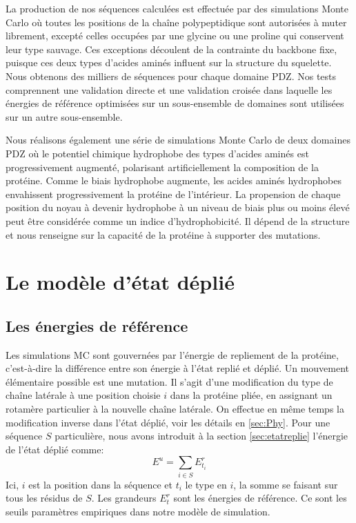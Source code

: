 La production de nos séquences calculées est effectuée par des simulations Monte Carlo où toutes les positions de la chaîne polypeptidique sont autorisées à muter librement, excepté celles occupées par une glycine ou une proline qui conservent leur type sauvage. Ces exceptions découlent de la contrainte du backbone fixe, puisque ces deux types d'acides aminés influent sur la structure du squelette. Nous obtenons des milliers de séquences pour chaque domaine PDZ. Nos tests comprennent une validation directe et une validation croisée dans laquelle les énergies de référence optimisées sur un sous-ensemble de domaines sont utilisées sur un autre sous-ensemble.

Nous réalisons également une série de simulations Monte Carlo de deux domaines PDZ où le potentiel chimique hydrophobe des types d'acides aminés est progressivement augmenté, polarisant artificiellement la composition de la protéine. Comme le biais hydrophobe augmente, les acides aminés hydrophobes envahissent progressivement la protéine de l'intérieur. La propension de chaque position du noyau à devenir hydrophobe à un niveau de biais plus ou moins élevé peut être considérée comme un indice d'hydrophobicité. Il dépend de la structure et nous renseigne sur la capacité de la protéine à supporter des mutations.

\section{Le modèle d'état déplié}
\subsection{Les énergies de référence}
\label{sec:enerref}
Les simulations MC sont gouvernées par l'énergie de repliement de la protéine, c'est-à-dire la différence entre
son énergie à l'état replié et déplié. Un mouvement élémentaire possible est une \og mutation\fg. Il s'agit d'une modification du type de chaîne latérale à une position choisie $i$ dans la protéine pliée, en assignant un rotamère particulier à la nouvelle chaîne latérale. On effectue en même temps la modification inverse dans l'état déplié, voir les détails en \ref{sec:Phy}. Pour une séquence $S$ particulière, nous avons introduit à la section \ref{sec:etatreplie} l'énergie de l'état déplié comme:
\begin{equation}
  E^u=\sum_{i\in S}E^r_{t_i}
  \label{eq:unfolded}
\end{equation} 
Ici, $i$ est la position dans la séquence et $t_i$ le type en $i$, la somme se faisant sur tous les résidus de $S$. Les grandeurs $E_t^r$ sont les  \og énergies de référence\fg. Ce sont les seuils paramètres empiriques dans notre modèle de simulation. 

